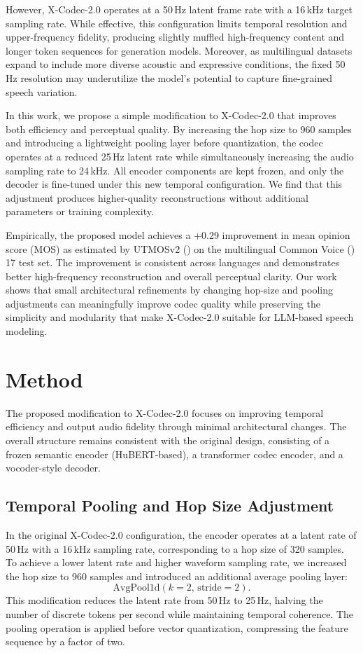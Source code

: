 \documentclass[preprint]{article}
\begin{document}
However, X-Codec-2.0 operates at a 50\,Hz latent frame rate with a 16\,kHz target sampling rate.  
While effective, this configuration limits temporal resolution and upper-frequency fidelity, producing slightly muffled high-frequency content and longer token sequences for generation models.  
Moreover, as multilingual datasets expand to include more diverse acoustic and expressive conditions, the fixed 50\,Hz resolution may underutilize the model's potential to capture fine-grained speech variation.

In this work, we propose a simple modification to X-Codec-2.0 that improves both efficiency and perceptual quality.  
By increasing the hop size to 960 samples and introducing a lightweight pooling layer before quantization, the codec operates at a reduced 25\,Hz latent rate while simultaneously increasing the audio sampling rate to 24\,kHz.  
All encoder components are kept frozen, and only the decoder is fine-tuned under this new temporal configuration.  
We find that this adjustment produces higher-quality reconstructions without additional parameters or training complexity.

Empirically, the proposed model achieves a +0.29 improvement in mean opinion score (MOS) as estimated by UTMOSv2 (\citet{baba2024t05voicemoschallenge2024}) on the multilingual Common Voice (\citet{ardila2020commonvoicemassivelymultilingualspeech}) 17 test set.  
The improvement is consistent across languages and demonstrates better high-frequency reconstruction and overall perceptual clarity.  
Our work shows that small architectural refinements by changing hop-size and pooling adjustments can meaningfully improve codec quality while preserving the simplicity and modularity that make X-Codec-2.0 suitable for LLM-based speech modeling.

\section{Method}
\label{sec:method}

The proposed modification to X-Codec-2.0 focuses on improving temporal efficiency and output audio fidelity through minimal architectural changes. The overall structure remains consistent with the original design, consisting of a frozen semantic encoder (HuBERT-based), a transformer codec encoder, and a vocoder-style decoder.

\subsection{Temporal Pooling and Hop Size Adjustment}
In the original X-Codec-2.0 configuration, the encoder operates at a latent rate of 50\,Hz with a 16\,kHz sampling rate, corresponding to a hop size of 320 samples. To achieve a lower latent rate and higher waveform sampling rate, we increased the hop size to 960 samples and introduced an additional average pooling layer:
\[
\text{AvgPool1d}(k=2,\, \text{stride}=2).
\]
This modification reduces the latent rate from 50\,Hz to 25\,Hz, halving the number of discrete tokens per second while maintaining temporal coherence. The pooling operation is applied before vector quantization, compressing the feature sequence by a factor of two.
\end{document}
